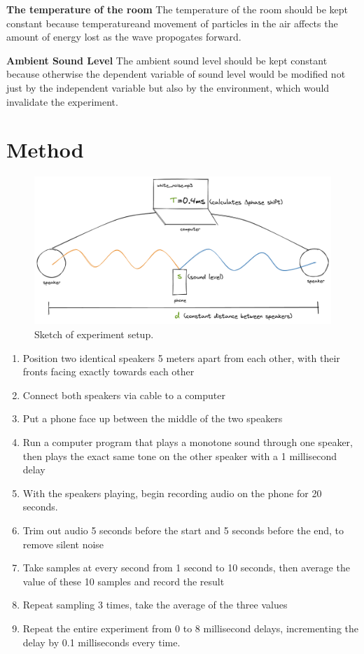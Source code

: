\documentclass[index]{subfiles}
\begin{document}
\textbf{The temperature of the room} The temperature of the room should be kept constant because temperatureand movement of particles in the air affects the amount of energy lost as the wave propogates forward.

\textbf{Ambient Sound Level} The ambient sound level should be kept constant because otherwise the dependent variable of sound level would be modified not just by the independent variable but also by the environment, which would invalidate the experiment.

\section{Method}

\begin{figure}[H]
    \centering
    \includegraphics[scale=0.24]{sound_diagram.png}
    \caption{Sketch of experiment setup.}
\end{figure}

\begin{enumerate}
    \item Position two identical speakers 5 meters apart from each other, with their fronts facing exactly towards each other
    \item Connect both speakers via cable to a computer
    \item Put a phone face up between the middle of the two speakers
    \item Run a computer program that plays a monotone sound through one speaker, then plays the exact same tone on the other speaker with a 1 millisecond delay
    \item With the speakers playing, begin recording audio on the phone for 20 seconds.
    \item Trim out audio 5 seconds before the start and 5 seconds before the end, to remove silent noise
    \item Take samples at every second from 1 second to 10 seconds, then average the value of these 10 samples and record the result 
    \item Repeat sampling 3 times, take the average of the three values
    \item Repeat the entire experiment from 0 to 8 millisecond delays, incrementing the delay by 0.1 milliseconds every time.
\end{enumerate}
\end{document}
